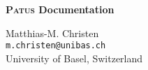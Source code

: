 

\pagestyle{empty}
\sffamily

\begin{center}
    \Huge\bfseries
    \textsc{Patus} Documentation
\end{center}

\vfill
\begin{center}
	\Large
	Matthias-M. Christen\\
	\texttt{m.christen@unibas.ch}\\
	University of Basel, Switzerland
\end{center}


\cleardoublepage

\rmfamily
\normalfont

\pagestyle{headings}
\tableofcontents


